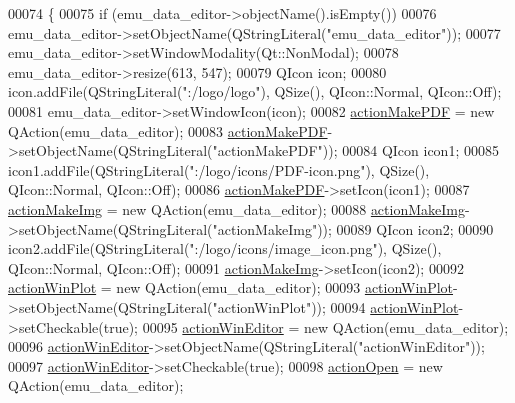 \begin{DoxyCode}
00074     \{
00075         \textcolor{keywordflow}{if} (emu\_data\_editor->objectName().isEmpty())
00076             emu\_data\_editor->setObjectName(QStringLiteral(\textcolor{stringliteral}{"emu\_data\_editor"}));
00077         emu\_data\_editor->setWindowModality(Qt::NonModal);
00078         emu\_data\_editor->resize(613, 547);
00079         QIcon icon;
00080         icon.addFile(QStringLiteral(\textcolor{stringliteral}{":/logo/logo"}), QSize(), QIcon::Normal, QIcon::Off);
00081         emu\_data\_editor->setWindowIcon(icon);
00082         \hyperlink{a00079_af013c084ff0ed9ae39a60aa7a39bdd91}{actionMakePDF} = \textcolor{keyword}{new} QAction(emu\_data\_editor);
00083         \hyperlink{a00079_af013c084ff0ed9ae39a60aa7a39bdd91}{actionMakePDF}->setObjectName(QStringLiteral(\textcolor{stringliteral}{"actionMakePDF"}));
00084         QIcon icon1;
00085         icon1.addFile(QStringLiteral(\textcolor{stringliteral}{":/logo/icons/PDF-icon.png"}), QSize(), QIcon::Normal, QIcon::Off);
00086         \hyperlink{a00079_af013c084ff0ed9ae39a60aa7a39bdd91}{actionMakePDF}->setIcon(icon1);
00087         \hyperlink{a00079_a345313e538e5ef49cd27c1fc0bdd4173}{actionMakeImg} = \textcolor{keyword}{new} QAction(emu\_data\_editor);
00088         \hyperlink{a00079_a345313e538e5ef49cd27c1fc0bdd4173}{actionMakeImg}->setObjectName(QStringLiteral(\textcolor{stringliteral}{"actionMakeImg"}));
00089         QIcon icon2;
00090         icon2.addFile(QStringLiteral(\textcolor{stringliteral}{":/logo/icons/image\_icon.png"}), QSize(), QIcon::Normal, QIcon::Off);
00091         \hyperlink{a00079_a345313e538e5ef49cd27c1fc0bdd4173}{actionMakeImg}->setIcon(icon2);
00092         \hyperlink{a00079_a0aeb289d8df9db6f4329e9000e44d511}{actionWinPlot} = \textcolor{keyword}{new} QAction(emu\_data\_editor);
00093         \hyperlink{a00079_a0aeb289d8df9db6f4329e9000e44d511}{actionWinPlot}->setObjectName(QStringLiteral(\textcolor{stringliteral}{"actionWinPlot"}));
00094         \hyperlink{a00079_a0aeb289d8df9db6f4329e9000e44d511}{actionWinPlot}->setCheckable(\textcolor{keyword}{true});
00095         \hyperlink{a00079_aa5d56420958ab4fd1239e29714d75e18}{actionWinEditor} = \textcolor{keyword}{new} QAction(emu\_data\_editor);
00096         \hyperlink{a00079_aa5d56420958ab4fd1239e29714d75e18}{actionWinEditor}->setObjectName(QStringLiteral(\textcolor{stringliteral}{"actionWinEditor"}));
00097         \hyperlink{a00079_aa5d56420958ab4fd1239e29714d75e18}{actionWinEditor}->setCheckable(\textcolor{keyword}{true});
00098         \hyperlink{a00079_a3ceb57268680eb23f6a3d522b303bb43}{actionOpen} = \textcolor{keyword}{new} QAction(emu\_data\_editor);

\end{DoxyCode}
